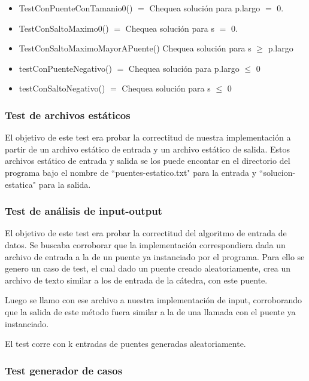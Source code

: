 \begin{itemize}
  \item TestConPuenteConTamanio0() $=$ Chequea soluci\'on para p.largo $=$ 0.
  \item 	TestConSaltoMaximo0() $=$ Chequea soluci\'on para s $=$ 0.
  \item TestConSaltoMaximoMayorAPuente() Chequea soluci\'on para s $\geq$ p.largo 
  \item testConPuenteNegativo() $=$ Chequea soluci\'on para p.largo $\leq$ 0
  \item testConSaltoNegativo() $=$ Chequea soluci\'on para s $\leq$ 0
\end{itemize}

\subsubsection{Test de archivos est\'aticos}

El objetivo de este test era probar la correctitud de nuestra implementaci\'on a partir de un archivo est\'atico de entrada y un archivo est\'atico de salida.
Estos archivos est\'atico de entrada y salida se los puede encontar en el directorio del programa bajo el nombre de ``puentes-estatico.txt" para la entrada y ``solucion-estatica" para la salida.


\subsubsection{Test de an\'alisis de input-output}

El objetivo de este test era probar la correctitud del algoritmo de entrada de datos.
Se buscaba corroborar que la implementaci\'on correspondiera dada un archivo de entrada a la de un puente ya instanciado por el programa.
Para ello se genero un caso de test, el cual dado un puente creado aleatoriamente, crea un archivo de texto similar a los de entrada de la c\'atedra, con este puente. 

Luego se llamo con ese archivo a nuestra implementaci\'on de input, corroborando que la salida de este m\'etodo fuera similar a la de una llamada con el puente ya instanciado.

El test corre con k entradas de puentes generadas aleatoriamente.

\subsubsection{Test generador de casos}

